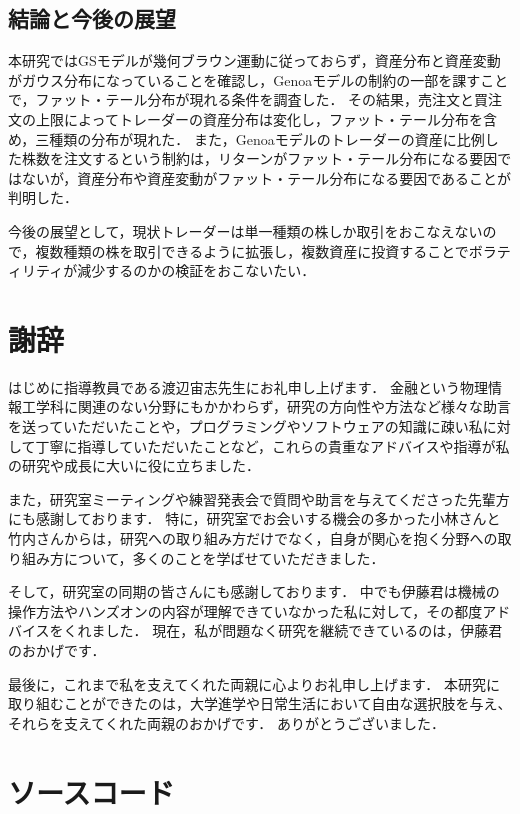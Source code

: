 \documentclass[titlepage]{jsreport}
\begin{document}
\section{結論と今後の展望}
本研究ではGSモデルが幾何ブラウン運動に従っておらず，資産分布と資産変動がガウス分布になっていることを確認し，Genoaモデルの制約の一部を課すことで，ファット・テール分布が現れる条件を調査した．
その結果，売注文と買注文の上限によってトレーダーの資産分布は変化し，ファット・テール分布を含め，三種類の分布が現れた．
また，Genoaモデルのトレーダーの資産に比例した株数を注文するという制約は，リターンがファット・テール分布になる要因ではないが，資産分布や資産変動がファット・テール分布になる要因であることが判明した．

今後の展望として，現状トレーダーは単一種類の株しか取引をおこなえないので，複数種類の株を取引できるように拡張し，複数資産に投資することでボラティリティが減少するのかの検証をおこないたい．

\chapter*{謝辞}
はじめに指導教員である渡辺宙志先生にお礼申し上げます．
金融という物理情報工学科に関連のない分野にもかかわらず，研究の方向性や方法など様々な助言を送っていただいたことや，プログラミングやソフトウェアの知識に疎い私に対して丁寧に指導していただいたことなど，これらの貴重なアドバイスや指導が私の研究や成長に大いに役に立ちました．


また，研究室ミーティングや練習発表会で質問や助言を与えてくださった先輩方にも感謝しております．
特に，研究室でお会いする機会の多かった小林さんと竹内さんからは，研究への取り組み方だけでなく，自身が関心を抱く分野への取り組み方について，多くのことを学ばせていただきました．

そして，研究室の同期の皆さんにも感謝しております．
中でも伊藤君は機械の操作方法やハンズオンの内容が理解できていなかった私に対して，その都度アドバイスをくれました．
現在，私が問題なく研究を継続できているのは，伊藤君のおかげです．

最後に，これまで私を支えてくれた両親に心よりお礼申し上げます．
本研究に取り組むことができたのは，大学進学や日常生活において自由な選択肢を与え、それらを支えてくれた両親のおかげです．
ありがとうございました．

\appendix

\chapter{ソースコード}









\end{document}
